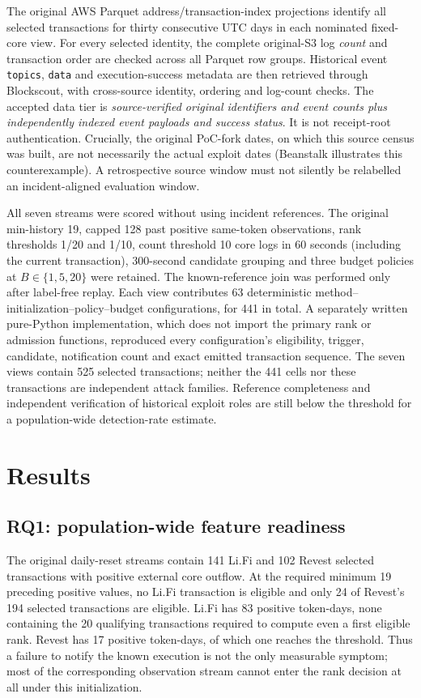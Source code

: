 \documentclass[preprint,12pt,authoryear]{elsarticle}
\begin{document}
The original AWS Parquet address/transaction-index projections identify all selected transactions for thirty consecutive UTC days in each nominated fixed-core view. For every selected identity, the complete original-S3 log \emph{count} and transaction order are checked across all Parquet row groups. Historical event \texttt{topics}, \texttt{data} and execution-success metadata are then retrieved through Blockscout, with cross-source identity, ordering and log-count checks. The accepted data tier is \emph{source-verified original identifiers and event counts plus independently indexed event payloads and success status}. It is not receipt-root authentication. Crucially, the original PoC-fork dates, on which this source census was built, are not necessarily the actual exploit dates (Beanstalk illustrates this counterexample). A retrospective source window must not silently be relabelled an incident-aligned evaluation window.

All seven streams were scored without using incident references. The original min-history 19, capped 128 past positive same-token observations, rank thresholds 1/20 and 1/10, count threshold 10 core logs in 60 seconds (including the current transaction), 300-second candidate grouping and three budget policies at $B\in\{1,5,20\}$ were retained. The known-reference join was performed only after label-free replay. Each view contributes 63 deterministic method--initialization--policy--budget configurations, for 441 in total. A separately written pure-Python implementation, which does not import the primary rank or admission functions, reproduced every configuration's eligibility, trigger, candidate, notification count and exact emitted transaction sequence. The seven views contain 525 selected transactions; neither the 441 cells nor these transactions are independent attack families. Reference completeness and independent verification of historical exploit roles are still below the threshold for a population-wide detection-rate estimate.

\section{Results}\label{sec:results}

\subsection{RQ1: population-wide feature readiness}
The original daily-reset streams contain 141 Li.Fi and 102 Revest selected transactions with positive external core outflow. At the required minimum 19 preceding positive values, no Li.Fi transaction is eligible and only 24 of Revest's 194 selected transactions are eligible. Li.Fi has 83 positive token-days, none containing the 20 qualifying transactions required to compute even a first eligible rank. Revest has 17 positive token-days, of which one reaches the threshold. Thus a failure to notify the known execution is not the only measurable symptom; most of the corresponding observation stream cannot enter the rank decision at all under this initialization.
\end{document}
